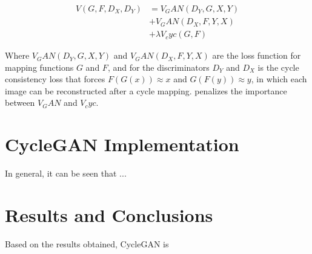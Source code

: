 \documentclass[peerreview]{IEEEtran}
\begin{document}
\begin{equation}
    \begin{split}
         V(G, F, D_X, D_Y) & = V_GAN(D_Y, G, X, Y) \\
         & + V_GAN(D_X, F, Y, X) \\
         & + \lambda V_cyc(G, F)
    \end{split}
\end{equation}

Where $V_GAN(D_Y, G, X, Y)$ and $V_GAN(D_X, F, Y, X)$ are the loss function for mapping functions $G$ and $F$, and for the discriminators $D_Y$ and $D_X$ is the cycle consistency loss that forces $F(G(x)) \approx x$ and $G(F(y)) \approx y$, in which each image can be reconstructed after a cycle mapping. \lambda penalizes the importance between $V_GAN$ and $V_cyc$.


\section{CycleGAN Implementation}
In general, it can be seen that ...


\section{Results and Conclusions}
Based on the results obtained, CycleGAN is

\end{document}
